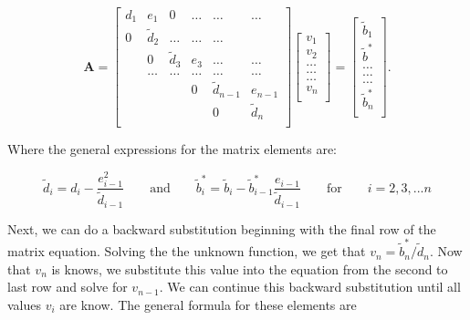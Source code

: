 \documentclass[%
oneside,                 %
final,                   %
10pt]{article}
\begin{document}
\[
    \mathbf{A} = \begin{bmatrix}
                           d_1& e_1 & 0 &\dots   & \dots &\dots \\
                           0 & \tilde{d}_2 &\dots &\dots &\dots \\
                           & 0 & \tilde{d}_3 & e_3 & \dots & \dots \\
                           & \dots   & \dots &\dots   &\dots & \dots \\
                           &   &  & 0  &\tilde{d}_{n-1}& e_{n-1} \\
                           &    &  &   &0 & \tilde{d}_n \\
                      \end{bmatrix}\begin{bmatrix}
                           v_1\\
                           v_2\\
                           \dots \\
                          \dots  \\
                          \dots \\
                           v_n\\
                      \end{bmatrix}
  =\begin{bmatrix}
                           \tilde{b}_1\\
                           \tilde{b}^*\\
                           \dots \\
                           \dots \\
                          \dots \\
                           \tilde{b}^*_n\\
                      \end{bmatrix}.
\]

Where the general expressions for the matrix elements are:


\begin{equation} \label{eqn:General12}
\tilde{d}_i = d_i - \frac{e^2_{i-1}}{\tilde{d}_{i-1}}
\qquad \text{and} \qquad
\tilde{b}^*_i = \tilde{b}_i - \tilde{b}_{i-1}^* \frac{e_{i-1}}{\tilde{d}_{i-1}} 
\qquad \text{for} \qquad i=2,3,...n
\end{equation}



Next, we can do a backward substitution beginning with the final row of the matrix equation.  Solving the the unknown function, we get that $v_n=\tilde{b}^*_n/\tilde{d}_n$.  Now that $v_n$ is knows, we substitute this value into the equation from the second to last row and solve for $v_{n-1}$.  We can continue this backward substitution until all values $v_i$ are know.  The general formula for these elements are
\end{document}
